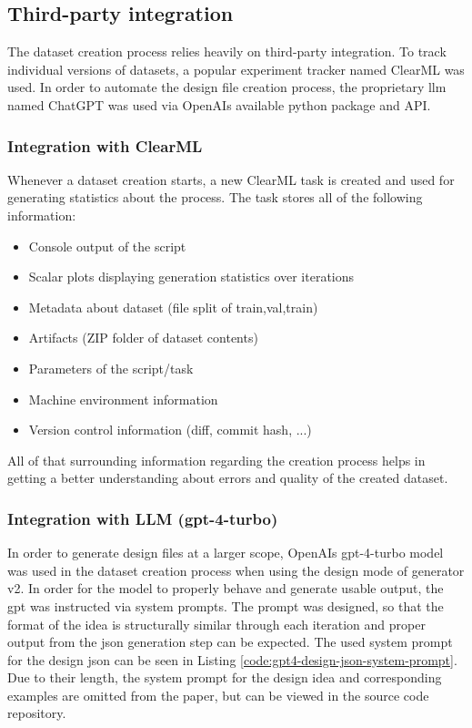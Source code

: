 \documentclass[Bachelor, BIC, english, fhCitStyle, IEEE]{BASE/twbook} %
\newcommand{\nocontentsline}[3]{}
\newcommand{\hidsubsubsection}[1]{\bgroup\let\addcontentsline=\nocontentsline\subsubsection{#1}\egroup}
\begin{document}
\subsection{Third-party integration} %
The dataset creation process relies heavily on third-party integration. To track individual versions of datasets, a popular experiment tracker named ClearML was used. In order to automate the design file creation process, the proprietary \ac{llm} named ChatGPT was used via OpenAIs available python package and API.
\hidsubsubsection{Integration with ClearML}
Whenever a dataset creation starts, a new ClearML task is created and used for generating statistics about the process. The task stores all of the following information:
\begin{itemize}
    \item Console output of the script
    \item Scalar plots displaying generation statistics over iterations
    \item Metadata about dataset (file split of train,val,train)
    \item Artifacts (ZIP folder of dataset contents)
    \item Parameters of the script/task
    \item Machine environment information
    \item Version control information (diff, commit hash, ...)
\end{itemize}
All of that surrounding information regarding the creation process helps in getting a better understanding about errors and quality of the created dataset.
\hidsubsubsection{Integration with LLM (gpt-4-turbo)}
In order to generate design files at a larger scope, OpenAIs gpt-4-turbo model was used in the dataset creation process when using the design mode of generator v2. In order for the model to properly behave and generate usable output, the \ac{gpt} was instructed via system prompts.
The prompt was designed, so that the format of the idea is structurally similar through each iteration and proper output from the \ac{json} generation step can be expected. The used system prompt for the design \ac{json} can be seen in Listing \ref{code:gpt4-design-json-system-prompt}. Due to their length, the system prompt for the design idea and corresponding examples are omitted from the paper, but can be viewed in the source code repository.
\end{document}
